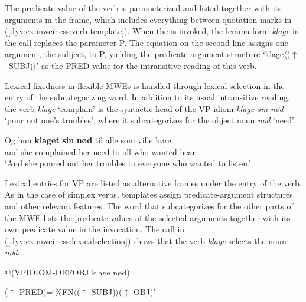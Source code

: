 \documentclass[output=paper]{langsci/langscibook}
\begin{document}
The predicate value of the verb is parameterized and listed together with its arguments in the  frame, which includes everything between quotation marks in (\ref{dyv:ex:mweiness:verb-template}).
When the  is invoked, the lemma form \emph{klage} in the  call replaces the parameter P. 
The equation on the second line assigns one argument, the subject, to P, yielding the predicate-argument  structure `klage$\langle$($\uparrow$~SUBJ)$\rangle$' as the PRED value for the intransitive reading of this verb.


Lexical fixedness in flexible MWEs is handled through lexical selection in the entry of the subcategorizing word. 
In addition to its usual intransitive reading, the verb \emph{klage} `complain' is the syntactic head of the VP idiom \emph{klage sin nød} `pour out one's troubles', where it subcategorizes for the object noun \emph{nød} `need'. 

 \ea\label{dyv:ex:mweiness:klagesinnød}
\gll Og hun \textbf{klaget} \textbf{sin} \textbf{nød} til alle som ville høre. \\
     and she complained her need to all who wanted hear \\
\glt `And she poured out her troubles to everyone who wanted to listen.’
\z

Lexical entries for VP  are listed as alternative  frames under the entry of the verb.
As in the case of simplex verbs, templates assign predicate-argument structures and other relevant features.  
The word that subcategorizes for the other parts of the MWE lists the predicate values of the selected arguments together with its own predicate value in the  invocation. 
The  call in (\ref{dyv:ex:mweiness:lexicalselection}) shows that the verb \emph{klage} selects the noun \emph{nød}. 

\ea\label{dyv:ex:mweiness:lexicalselection}
{\small 
@(VPIDIOM-DEFOBJ klage nød)
}
\z

\ea\label{dyv:ex:mweiness:subcatframe}
{\small
	  ($\uparrow$ PRED)=`\%FN$\langle$($\uparrow$ SUBJ)$\rangle$($\uparrow$ OBJ)'  \\
}
\z
\end{document}
